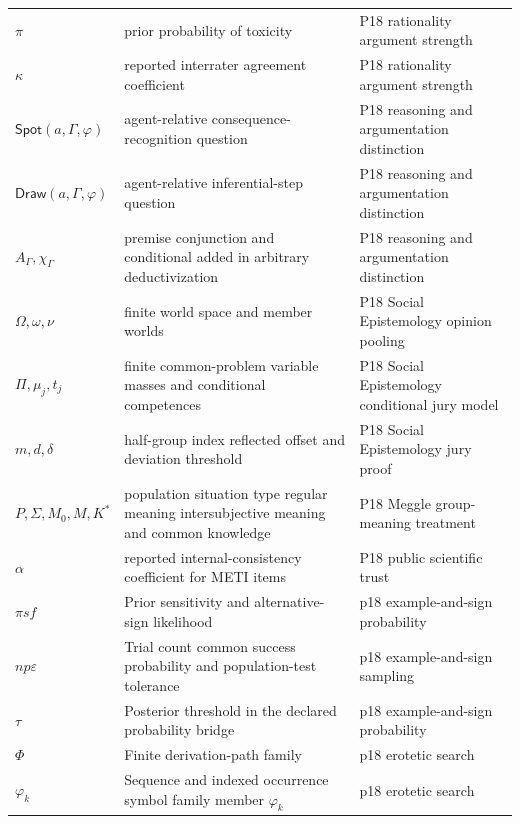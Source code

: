\begin{longtable}{@{}p{}p{}p{}@{}}
\(\pi\) & prior probability of toxicity & P18 rationality argument strength \\
\(\kappa\) & reported interrater agreement coefficient & P18 rationality argument strength \\
\(\mathsf{Spot}(a,\allowbreak \Gamma,\allowbreak \varphi)\) & agent-relative consequence-recognition question & P18 reasoning and argumentation distinction \\
\(\mathsf{Draw}(a,\allowbreak \Gamma,\allowbreak \varphi)\) & agent-relative inferential-step question & P18 reasoning and argumentation distinction \\
\(A_\Gamma,\allowbreak \chi_\Gamma\) & premise conjunction and conditional added in arbitrary deductivization & P18 reasoning and argumentation distinction \\
\(\Omega,\allowbreak \omega,\allowbreak \nu\) & finite world space and member worlds & P18 Social Epistemology opinion pooling \\
\(\Pi,\allowbreak \mu_j,\allowbreak t_j\) & finite common-problem variable masses and conditional competences & P18 Social Epistemology conditional jury model \\
\(m,\allowbreak d,\allowbreak \delta\) & half-group index reflected offset and deviation threshold & P18 Social Epistemology jury proof \\
\(P,\allowbreak \Sigma,\allowbreak M_0,\allowbreak M,\allowbreak K^*\) & population situation type regular meaning intersubjective meaning and common knowledge & P18 Meggle group-\allowbreak{}meaning treatment \\
\(\alpha\) & reported internal-consistency coefficient for METI items & P18 public scientific trust \\
\ensuremath{\pi s f} & Prior sensitivity and alternative-sign likelihood & p18 example-\allowbreak{}and-\allowbreak{}sign probability \\
\ensuremath{n p \varepsilon} & Trial count common success probability and population-test tolerance & p18 example-\allowbreak{}and-\allowbreak{}sign sampling \\
\ensuremath{\tau} & Posterior threshold in the declared probability bridge & p18 example-\allowbreak{}and-\allowbreak{}sign probability \\
\(\Phi\) & Finite derivation-path family & p18 erotetic search \\
\(\varphi_k\) & Sequence and indexed occurrence symbol family member \(\varphi_k\) & p18 erotetic search \\

\end{longtable}
